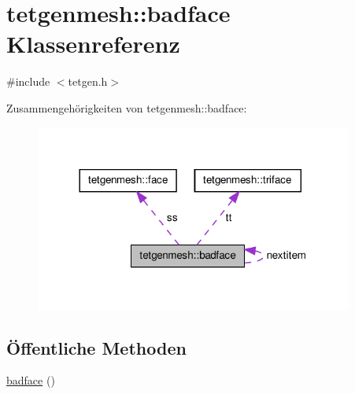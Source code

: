 \hypertarget{classtetgenmesh_1_1badface}{\section{tetgenmesh\-:\-:badface Klassenreferenz}
\label{classtetgenmesh_1_1badface}
}


{\ttfamily \#include $<$tetgen.\-h$>$}



Zusammengehörigkeiten von tetgenmesh\-:\-:badface\-:
\nopagebreak
\begin{figure}[H]
\begin{center}
\leavevmode
\includegraphics[width=296pt]{classtetgenmesh_1_1badface__coll__graph}
\end{center}
\end{figure}
\subsection*{Öffentliche Methoden}
\begin{DoxyCompactItemize}
\item 
\hyperlink{classtetgenmesh_1_1badface_abb0568159042a95b91eb193fcfca6aab}{badface} ()
\end{DoxyCompactItemize}
